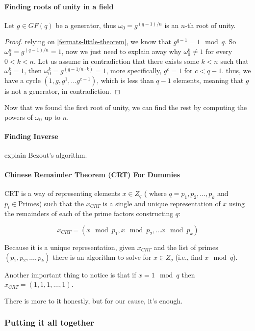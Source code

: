 \paragraph{Finding roots of unity in a field}

\begin{thm}
  Let $g\in GF(q)$ be a generator, thus
  $\omega_0=g^{(q-1)/n}$ is an $n$-th root of unity.
\end{thm}
\begin{proof}
  relying on \autoref{fermats-little-theorem}, we know that $g^{q-1}=1 \mod q$.
  So $\omega_0^n=g^{(q-1)/n}=1$, now we just need to explain away why $\omega_0^k \ne 1$ for 
  every $0<k<n$.
  Let us assume in contradiction that there exists some $k<n$ such that $\omega_0^k=1$, then 
  $\omega_0^k=g^{(q-1/n\cdot k)}=1$, more specifically, $g^c=1$ for $c<q-1$. thus, we have a 
  cycle $(1,g,g^1,...g^{c-1})$, which is less than $q-1$ elements, meaning that $g$ is not 
  a generator, in contradiction.
\end{proof}

Now that we found the first root of unity, we can find the rest by computing the powers of $\omega_0$ up to $n$.
\paragraph{\bf Finding Inverse}
 explain Bezout's algorithm.


\paragraph{\bf Chinese Remainder Theorem (CRT) For Dummies}
CRT is a way of representing elements $x\in Z_q$ (
  where $q=p_1,p_2,\dots,p_k$ and $p_i\in\text{Primes}$)
such that the $x_{CRT}$ is a single and unique representation of $x$ using the 
remainders of each of the prime factors constructing $q$:

$$ x_{CRT} = (x\mod p_1, x\mod p_2 ,\dots x\mod p_k ) $$



Because it is a unique representation, given $x_{CRT}$ and the list of
 primes $(p_1,p_2,\dots,p_k)$ there is an algorithm to solve for $x \in Z_q$
 (i.e., find $x \mod q$).


Another important thing to notice is that if  $x=1 \mod q$
 then $x_{CRT}= (1,1,1,\dots,1)$.


There is more to it honestly, but for our cause, it's enough.

\subsubsection{Putting it all together}

